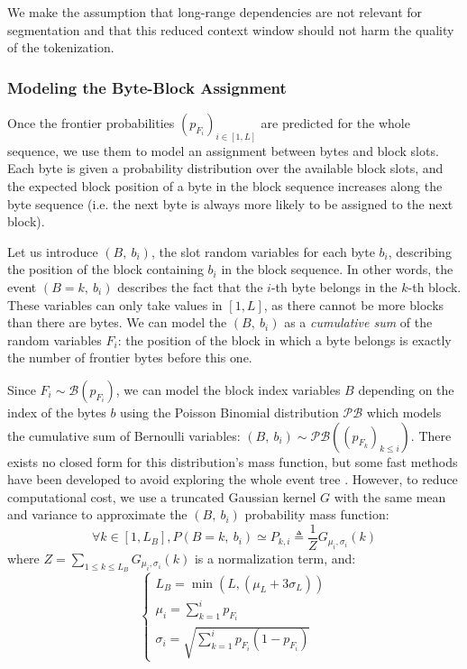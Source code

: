 We make the assumption that long-range dependencies are not relevant for segmentation and that this reduced context window should not harm the quality of the tokenization.


\subsubsection{Modeling the Byte-Block Assignment}
Once the frontier probabilities $(p_{F_i})_{i \in [1, L]}$ are predicted for the whole sequence, we use them to model an assignment between bytes and block slots. Each byte is given a probability distribution over the available block slots, and the expected block position of a byte in the block sequence increases along the byte sequence (i.e. the next byte is always more likely to be assigned to the next block).

Let us introduce $(B,\ b_i)$, the slot random variables for each byte $b_i$, describing the position of the block containing $b_i$ in the block sequence. In other words, the event $(B=k,\ b_i)$ describes the fact that the $i$-th byte belongs in the $k$-th block. These variables can only take values in $[1, L]$, as there cannot be more blocks than there are bytes. We can model the $(B,\ b_i)$ as a \textit{cumulative sum} of the random variables $F_i$: the position of the block in which a byte belongs is exactly the number of frontier bytes before this one.

Since $F_i \sim \mathcal{B}(p_{F_i})$, we can model the block index variables $B$ depending on the index of the bytes $b$ using the Poisson Binomial distribution $\mathcal{PB}$ which models the cumulative sum of Bernoulli variables: $\left(B,\ b_i\right) \sim \mathcal{PB}\!\left(\left(p_{F_k}\right)_{k \leq i}\right)$. There exists no closed form for this distribution's mass function, but some fast methods have been developed to avoid exploring the whole event tree \cite{BISCARRI201892, poibin_fft}. However, to reduce computational cost, we use a truncated Gaussian kernel $G$ with the same mean and variance to approximate the $(B,\ b_i)$ probability mass function:
$$
\forall k \in [1, L_B], P\!\left(B = k,\ b_i\right) \simeq P_{k,i} \triangleq \frac{1}{Z}G_{\mu_i, \sigma_i}(k)
$$
where $Z=\sum\limits_{1\leq k\leq L_B}G_{\mu_i, \sigma_i}(k)$ is a normalization term, and:
\begin{equation}
  \begin{cases}
    L_B = \min\left(L, \left(\mu_L + 3\sigma_L\right)\right)\\[11pt]
    \mu_i = \sum_{k=1}^{i} p_{F_i} \\[11pt]
    \sigma_i = \sqrt{\sum_{k=1}^{i} p_{F_i}\left(1-p_{F_i}\right)}
  \end{cases}
\end{equation}

